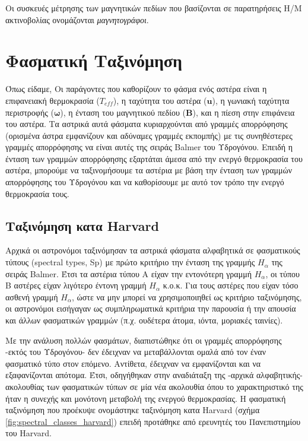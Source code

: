Οι συσκευές μέτρησης των μαγνητικών πεδίων που βασίζονται σε παρατηρήσεις Η/Μ ακτινοβολίας ονομάζονται \textit{μαγνητογράφοι}. 



\section{Φασματική Ταξινόμηση}
Όπως είδαμε, Οι παράγοντες που καθορίζουν το φάσμα ενός αστέρα είναι η επιφανειακή θερμοκρασία ($ T_{eff}$), η ταχύτητα του αστέρα ($\boldsymbol{u}$), η γωνιακή ταχύτητα περιστροφής ($\boldsymbol{\omega}$), η ένταση του μαγνητικού πεδίου ($\boldsymbol{B}$), και η πίεση στην επιφάνεια του αστέρα. Τα αστρικά αυτά φάσματα κυριαρχούνται από γραμμές απορρόφησης (ορισμένα άστρα εμφανίζουν και αδύναμες γραμμές εκπομπής) με τις συνηθέστερες γραμμές απορρόφησης να είναι αυτές της σειράς Balmer του Υδρογόνου. Επειδή η ένταση των γραμμών απορρόφησης εξαρτάται άμεσα από την ενεργό θερμοκρασία του αστέρα, μπορούμε να ταξινομήσουμε τα αστέρια με βάση την ένταση των γραμμών απορρόφησης του Υδρογόνου και να καθορίσουμε με αυτό τον τρόπο την ενεργό θερμοκρασία τους.


\subsection{Ταξινόμηση κατα Harvard}
Αρχικά οι αστρονόμοι ταξινόμησαν τα αστρικά φάσματα αλφαβητικά σε φασματικούς τύπους (spectral types, Sp) με πρώτο κριτήριο την ένταση της γραμμής $H_{\alpha}$ της σειράς Balmer. Έτσι τα αστέρια τύπου Α είχαν την εντονότερη γραμμή $H_{\alpha}$, οι τύπου Β αστέρες είχαν λιγότερο έντονη γραμμή $H_{\alpha}$ κ.ο.κ.
Για τους αστέρες που είχαν τόσο ασθενή γραμμή $H_{\alpha}$, ώστε να μην μπορεί να χρησιμοποιηθεί ως κριτήριο ταξινόμησης, οι αστρονόμοι εισήγαγαν ως συμπληρωματικά κριτήρια την παρουσία ή την απουσία και άλλων φασματικών γραμμών (π.χ. ουδέτερα άτομα, ιόντα, μοριακές ταινίες).

Με την ανάλυση πολλών φασμάτων, διαπιστώθηκε ότι οι γραμμές απορρόφησης -εκτός του Υδρογόνου- δεν έδειχναν να μεταβάλλονται ομαλά από τον έναν φασματικό τύπο στον επόμενο. Αντίθετα, έδειχναν να εμφανίζονται και να εξαφανίζονται απότομα. Έτσι, οδηγήθηκαν στην αναδιάταξη της -αρχικά αλφαβητικής- ακολουθίας των φασματικών τύπων σε μία νέα ακολουθία όπου το χαρακτηριστικό της ήταν η συνεχής και μονότονη μεταβολή της ενεργού θερμοκρασίας. Η φασματική ταξινόμηση που προέκυψε ονομάστηκε ταξινόμηση κατα Harvard (σχήμα \ref{fig:spectral_classes_harvard}) επειδή προτάθηκε από ερευνητές του Πανεπιστημίου του Harvard.

